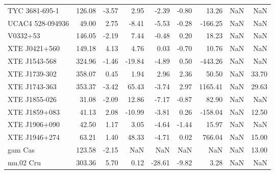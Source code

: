 \documentclass{article}%
\begin{document}
\begin{longtable}{lrrrrrrrr}
TYC 3681-695-1 & 126.08 & -3.57 & 2.95 & -2.39 & -0.80 & 13.26 & NaN & NaN \\
UCAC4 528-094936 & 49.00 & 2.75 & -8.41 & -5.53 & -0.28 & -166.25 & NaN & NaN \\
V0332+53 & 146.05 & -2.19 & 7.44 & -0.48 & 0.20 & 18.23 & NaN & NaN \\
XTE J0421+560 & 149.18 & 4.13 & 4.76 & 0.03 & -0.70 & 10.76 & NaN & NaN \\
XTE J1543-568 & 324.96 & -1.46 & -19.84 & -4.89 & 0.50 & -443.26 & NaN & NaN \\
XTE J1739-302 & 358.07 & 0.45 & 1.94 & 2.96 & 2.36 & 50.50 & NaN & 33.70 \\
XTE J1743-363 & 353.37 & -3.42 & 65.43 & -3.74 & 2.97 & 1165.41 & NaN & 29.63 \\
XTE J1855-026 & 31.08 & -2.09 & 12.86 & -7.17 & -0.87 & 82.90 & NaN & NaN \\
XTE J1859+083 & 41.13 & 2.08 & -10.99 & -3.81 & 0.26 & -158.04 & NaN & 12.50 \\
XTE J1906+090 & 42.50 & 1.17 & 3.05 & -4.64 & -1.44 & 15.97 & NaN & NaN \\
XTE J1946+274 & 63.21 & 1.40 & 48.33 & -4.71 & 0.02 & 766.04 & NaN & 15.00 \\
gam Cas & 123.58 & -2.15 & NaN & NaN & NaN & NaN & NaN & 13.00 \\
mu.02 Cru & 303.36 & 5.70 & 0.12 & -28.61 & -9.82 & 3.28 & NaN & NaN \\
\end{longtable}
%
\end{document}
